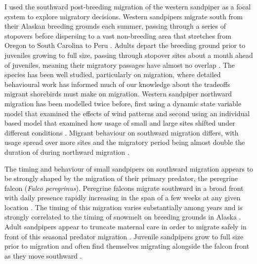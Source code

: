 
I used the southward post-breeding migration of the western sandpiper as a focal system to explore migratory decisions. Western sandpipers migrate south from their Alaskan breeding grounds each summer, passing through a series of stopovers before dispersing to a vast non-breeding area that stretches from Oregon to South Carolina to Peru \citep{Franks2014}. Adults depart the breeding ground prior to juveniles growing to full size, passing through stopover sites about a month ahead of juveniles, meaning their migratory passages have almost no overlap \citep{Butler1987}. The species has been well studied, particularly on migration, where detailed behavioural work has informed much of our knowledge about the tradeoffs migrant shorebirds must make on migration. Western sandpiper northward migration has been modelled twice before, first using a dynamic state variable model that examined the effects of wind patterns \citep{clark_fitness_1999} and second using an individual based model that examined how usage of small and large sites shifted under different conditions \citep{Taylor2007}. Migrant behaviour on southward migration differs, with usage spread over more sites and the migratory period being almost double the duration of during northward migration \citep{lank_effects_2003,ydenberg_interannual_2005,Hope2011,Taylor2007}. 

The timing and behaviour of small sandpipers on southward migration appears to be strongly shaped by the migration of their primary predator, the peregrine falcon (\textit{Falco peregrinus}). Peregrine falcons migrate southward in a broad front \citep[hereafter ``falcon front''; ][]{Hope2014} with daily presence rapidly increasing in the span of a few weeks at any given location \citep{lank_effects_2003}. The timing of this migration varies substantially among years and is strongly correlated to the timing of snowmelt on breeding grounds in Alaska \citep{Niehaus2006}.  Adult sandpipers appear to truncate maternal care in order to migrate safely in front of this seasonal predator migration \citep{Jamieson2014}. Juvenile sandpipers grow to full size prior to migration \citep{Stein2006b} and often find themselves migrating alongside the falcon front as they move southward \citep{Ydenberg2007b}. 

